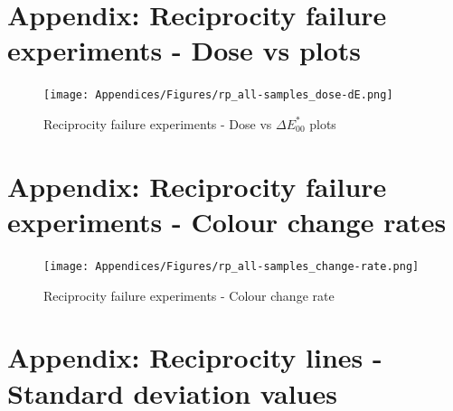 \begin{appendices}

\newpage
\section[\hspace{0.3cm}Reciprocity failure experiments - Dose vs \dEOO plots]{ Appendix: Reciprocity failure experiments - Dose vs \dEOO plots}
\label{app:ch3_rp_results_dose-dE}

\begin{figure}[!h]
\centering
\texttt{[image: Appendices/Figures/rp\_all-samples\_dose-dE.png]}
\caption*{Reciprocity failure experiments - Dose vs $\Delta E^*_{00}$ plots}
\end{figure}




\newpage
\section[\hspace{0.3cm}Reciprocity failure experiments - Colour change rates]{ Appendix: Reciprocity failure experiments - Colour change rates}
\label{app:ch3_rp_results_colour-change-rate}

\begin{figure}[!h]
\centering
\texttt{[image: Appendices/Figures/rp\_all-samples\_change-rate.png]}
\caption*{Reciprocity failure experiments - Colour change rate}
\end{figure}



\newpage
\section[\hspace{0.3cm}Reciprocity lines - Standard deviation values]{ Appendix: Reciprocity lines - Standard deviation values}
\label{app:ch3_rp_results_rp-lines_std}



\end{appendices}
